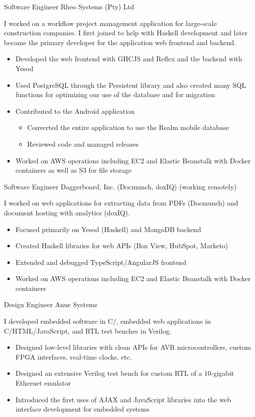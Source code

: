 \documentclass[11pt,a4paper,roman]{moderncv}
\begin{document}
\professionentry%
{}%
{Software Engineer}%
{Rheo Systems (Pty) Ltd}%
{\pretoria}%
{}%
{I worked on a workflow project management application for large-scale construction companies. I first joined to help with Haskell development and later became the primary developer for the application web frontend and backend.
\begin{itemize}[leftmargin=2em,nosep]
\item Developed the web frontend with GHCJS and Reflex and the backend with Yesod
\item Used PostgreSQL through the Persistent library and also created many SQL functions for optimizing our use of the database and for migration
\item Contributed to the Android application
  \begin{itemize}[leftmargin=2em,nosep]
  \item Converted the entire application to use the Realm mobile database
  \item Reviewed code and managed releases
  \end{itemize}
\item Worked on AWS operations including EC2 and Elastic Beanstalk with Docker containers as well as S3 for file storage
\end{itemize}}

\professionentry%
{}%
{Software Engineer}%
{Daggerboard, Inc. (Docmunch, doxIQ)}%
{\sanfrancisco{} (working remotely)}%
{}%
{I worked on web applications for extracting data from PDFs (Docmunch) and document hosting with analytics (doxIQ).
\begin{itemize}[leftmargin=2em,nosep]
\item Focused primarily on Yesod (Haskell) and MongoDB backend
\item Created Haskell libraries for web APIs (Box View, HubSpot, Marketo)
\item Extended and debugged TypeScript/AngularJS frontend
\item Worked on AWS operations including EC2 and Elastic Beanstalk with Docker containers
\end{itemize}}

\professionentry%
{}%
{Design Engineer}%
{Anue Systems}%
{\austin}%
{}%
{I developed embedded software in C/\Cpp, embedded web applications in C/HTML/JavaScript, and RTL test benches in Verilog.
\begin{itemize}[leftmargin=2em,nosep]
\item Designed low-level libraries with clean APIs for AVR microcontrollers, custom FPGA interfaces, real-time clocks, etc.
\item Designed an extensive Verilog test bench for custom RTL of a 10-gigabit Ethernet emulator
\item Introduced the first uses of AJAX and JavaScript libraries into the web interface development for embedded systems
\end{itemize}}
\end{document}
